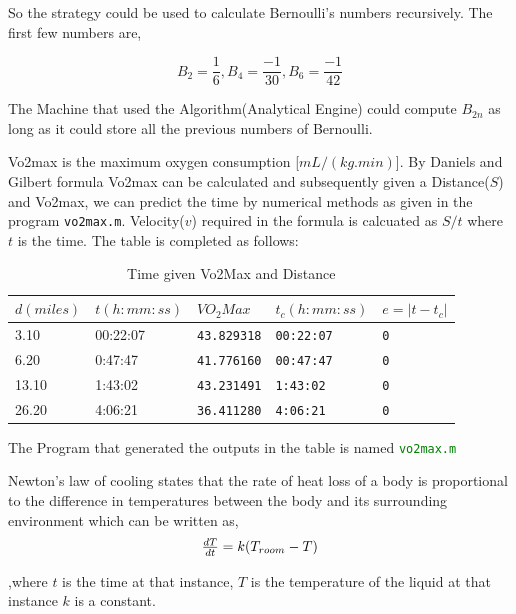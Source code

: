 \documentclass[fleqn,letterpaper,12pt]{report}
\begin{document}
So the strategy could be used to calculate Bernoulli's numbers recursively. The first few numbers are,

$$ B_2 = \frac{1}{6}, B_4 = \frac{-1}{30}, B_6 = \frac{-1}{42}$$

The Machine that used the Algorithm(Analytical Engine) could compute $B_{2n}$ as long as it could store all the previous numbers of Bernoulli.\cite{lll}
%
\newpage
{}
{}
\problem
Vo2max is the maximum oxygen consumption [$mL/(kg.min)$]. By Daniels and Gilbert formula Vo2max can be calculated and subsequently given a Distance($S$) and Vo2max, we can predict the time by numerical methods as given in the program {\tt vo2max.m}. Velocity{($v$)} required in the formula is calcuated as {$S/t$} where {$ t $} is the time. The table is completed as follows:
\begin{table}[h]
\centering
\caption{Time given Vo2Max and Distance}
\label{my-label}
\begin{tabular}{|l|l|l|l|l|}
\hline
$d(miles)$ & $t(h:mm:ss)$ & $VO_2Max$  & $t_c(h:mm:ss)$ & $e = |t - t_c|$ \\ \hline \hline
3.10       & 00:22:07    & {\tt43.829318} & {\tt00:22:07}      & {\tt0}               \\ \hline
6.20       & 0:47:47     & {\tt41.776160} & {\tt00:47:47}      & {\tt0}               \\ \hline
13.10      & 1:43:02     & {\tt43.231491} & {\tt1:43:02}       & {\tt0}               \\ \hline
26.20      & 4:06:21     & {\tt36.411280} & {\tt4:06:21}       & {\tt0}               \\ \hline
\end{tabular}%
\end{table}

The Program that generated the outputs in the table is named \textcolor{Green}{\tt vo2max.m}
%
\newpage
{}
{}
\problem
Newton's law of cooling states that the rate of heat loss of a body is proportional to the difference in temperatures between the body and its surrounding environment which can be written as,
\begin{equation}
$$\frac{dT}{dt} = k(T_{room} -T)$$
\end{equation}

,where $t$ is the time at that instance, $T$ is the temperature of the liquid at that instance $k$ is a constant.
\end{document}
